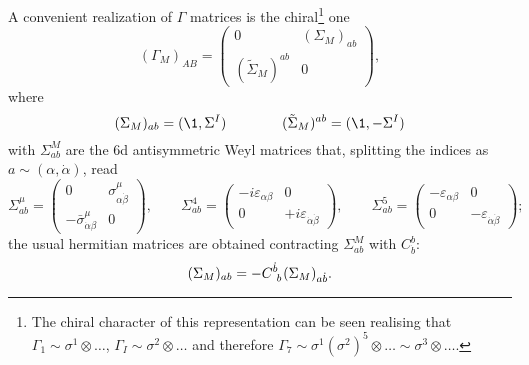 A convenient realization of $\Gamma$ matrices is the chiral\footnote{The chiral character of this representation can be seen realising that \( \Gamma_1 \sim \sigma^1 \otimes \ldots \), \(\Gamma_I \sim \sigma^2 \otimes \ldots \) and therefore \(  \Gamma_7 \sim \sigma^1 (\sigma^2)^5 \otimes \ldots \sim \sigma^3 \otimes \ldots \).   } one
\begin{equation}\label{conjug-gamma-6d}
(\Gamma_M)_{AB} =
	\begin{pmatrix}
	0 & (\Sigma_M)_{a  b}  \\
	(\tilde \Sigma_M)^{ a b} & 0 
	\end{pmatrix},
\end{equation}
where
\begin{equation}
(\Sigma_M)_{a  b} = (\1, \Sigma^I)
\qquad\qquad
(\tilde \Sigma_M)^{ a b} = (\1, - \Sigma^I)
\end{equation}
with  $\Sigma^M_{ab}$ are the 6d antisymmetric Weyl matrices that, splitting the indices as $a \sim (\alpha,\dot{\alpha})$, read
\begin{equation*}
	\Sigma^\mu_{ab}
			=
		\begin{pmatrix}
			0 & \sigma^\mu_{\alpha  \dot{\beta} } \\
			-\bar \sigma^\mu_{\dot \alpha \beta} & 0
		\end{pmatrix},
%
\qquad
%
	\Sigma^4_{ab}
		=
	\begin{pmatrix}
		-i\varepsilon_{\alpha \beta} & 0 \\
		0 & +i \varepsilon_{\dot \alpha \dot \beta}
	\end{pmatrix},
%
\qquad
%
	\Sigma^5_{ab}
		=
	\begin{pmatrix}
		-\varepsilon_{\alpha \beta} & 0 \\
		0 & -\varepsilon_{\dot \alpha \dot \beta}
	\end{pmatrix};
\end{equation*}
the usual hermitian matrices are obtained contracting \( \Sigma^M_{ab} \) with \( C^b_{\dot{b}} \):
\begin{equation}
(\Sigma_M)_{ab} = -  C\indices{^{\dot b}_b} (\Sigma_M)_{a \dot b} .
\end{equation}

